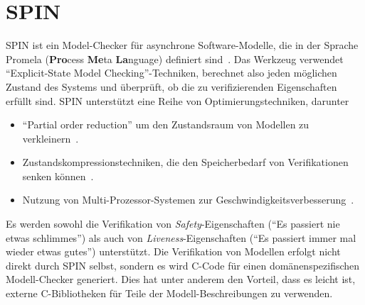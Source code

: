 \section{SPIN}
\label{sec:spin}
SPIN ist ein Model-Checker für asynchrone Software-Modelle, die in der Sprache Promela ({\bf Pro}cess {\bf Me}ta {\bf La}nguage) definiert sind~\cite{spinbook}.
Das Werkzeug verwendet "`Explicit-State Model Checking"'-Techniken, berechnet also jeden möglichen Zustand des Systems und überprüft, ob die zu verifizierenden Eigenschaften erfüllt sind.
SPIN unterstützt eine Reihe von Optimierungstechniken, darunter
\begin{itemize}
\item "`Partial order reduction"' um den Zustandsraum von Modellen zu verkleinern~\cite{partial_order_reduction}.
\item Zustandskompressionstechniken, die den Speicherbedarf von Verifikationen senken können~\cite{spin_state_compression}.
\item Nutzung von Multi-Prozessor-Systemen zur Geschwindigkeitsverbesserung~\cite{spin_multi_core}.
\end{itemize}
Es werden sowohl die Verifikation von \emph{Safety}-Eigenschaften ("`Es passiert nie etwas schlimmes"') als auch von \emph{Liveness}-Eigenschaften ("`Es passiert immer mal wieder etwas gutes"') unterstützt.
Die Verifikation von Modellen erfolgt nicht direkt durch SPIN selbst, sondern es wird C-Code für einen domänenspezifischen Modell-Checker generiert.
Dies hat unter anderem den Vorteil, dass es leicht ist, externe C-Bibliotheken für Teile der Modell-Beschreibungen zu verwenden.
